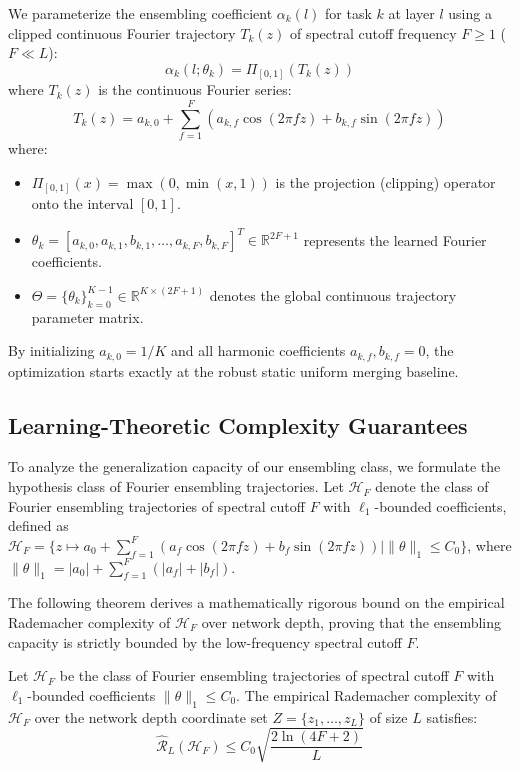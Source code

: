 We parameterize the ensembling coefficient $\alpha_k(l)$ for task $k$ at layer $l$ using a clipped continuous Fourier trajectory $T_k(z)$ of spectral cutoff frequency $F \ge 1$ ($F \ll L$):
\begin{equation}
    \alpha_k(l; \theta_k) = \Pi_{[0,1]} \left( T_k(z) \right)
\end{equation}
where $T_k(z)$ is the continuous Fourier series:
\begin{equation}
    T_k(z) = a_{k,0} + \sum_{f=1}^F \left( a_{k,f} \cos(2\pi f z) + b_{k,f} \sin(2\pi f z) \right)
\end{equation}
where:
\begin{itemize}
    \item $\Pi_{[0,1]}(x) = \max(0, \min(x, 1))$ is the projection (clipping) operator onto the interval $[0, 1]$.
    \item $\theta_k = [a_{k,0}, a_{k,1}, b_{k,1}, \dots, a_{k,F}, b_{k,F}]^T \in \mathbb{R}^{2F+1}$ represents the learned Fourier coefficients.
    \item $\Theta = \{\theta_k\}_{k=0}^{K-1} \in \mathbb{R}^{K \times (2F+1)}$ denotes the global continuous trajectory parameter matrix.
\end{itemize}
By initializing $a_{k,0} = 1/K$ and all harmonic coefficients $a_{k,f}, b_{k,f} = 0$, the optimization starts exactly at the robust static uniform merging baseline.

\subsection{Learning-Theoretic Complexity Guarantees}
To analyze the generalization capacity of our ensembling class, we formulate the hypothesis class of Fourier ensembling trajectories. Let $\mathcal{H}_F$ denote the class of Fourier ensembling trajectories of spectral cutoff $F$ with $\ell_1$-bounded coefficients, defined as $\mathcal{H}_F = \{ z \mapsto a_0 + \sum_{f=1}^F ( a_f \cos(2\pi f z) + b_f \sin(2\pi f z) ) \mid \|\theta\|_1 \le C_0 \}$, where $\|\theta\|_1 = |a_0| + \sum_{f=1}^F (|a_f| + |b_f|)$. 

The following theorem derives a mathematically rigorous bound on the empirical Rademacher complexity of $\mathcal{H}_F$ over network depth, proving that the ensembling capacity is strictly bounded by the low-frequency spectral cutoff $F$.

\begin{theorem}
\label{thm:rademacher}
Let $\mathcal{H}_F$ be the class of Fourier ensembling trajectories of spectral cutoff $F$ with $\ell_1$-bounded coefficients $\|\theta\|_1 \le C_0$. The empirical Rademacher complexity of $\mathcal{H}_F$ over the network depth coordinate set $Z = \{z_1, \dots, z_L\}$ of size $L$ satisfies:
\begin{equation}
    \widehat{\mathcal{R}}_L(\mathcal{H}_F) \le C_0 \sqrt{\frac{2 \ln(4F+2)}{L}}
\end{equation}
\end{theorem}

